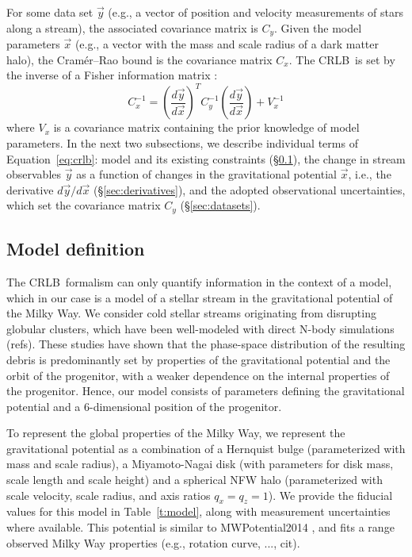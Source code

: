\documentclass[modern]{aastex61}
\newcommand{\acronym}[1]{{\small{#1}}}
\newcommand{\CRLB}{\acronym{CRLB}}
\begin{document}
For some data set $\vec{y}$ (e.g., a vector of position and velocity measurements of stars along a stream), the associated covariance matrix is $C_y$.
Given the model parameters $\vec{x}$ (e.g., a vector with the mass and scale radius of a dark matter halo), the Cram\' er--Rao bound is the covariance matrix $C_x$.
The \CRLB\ is set by the inverse of a Fisher information matrix \citep{}:
\begin{equation}
C_x^{-1} = \left(\frac{d\vec{y}}{d\vec{x}}\right)^{T} C_y^{-1} \left(\frac{d\vec{y}}{d\vec{x}}\right) + V_x^{-1}
\label{eq:crlb}
\end{equation}
where $V_x$ is a covariance matrix containing the prior knowledge of model parameters.
In the next two subsections, we describe individual terms of Equation~\ref{eq:crlb}: model and its existing constraints (\S\ref{sec:model}), the change in stream observables $\vec{y}$ as a function of changes in the gravitational potential $\vec{x}$, i.e., the derivative $d\vec{y}/d\vec{x}$ (\S\ref{sec:derivatives}), and the adopted observational uncertainties, which set the covariance matrix $C_y$ (\S\ref{sec:datasets}).

\subsection{Model definition}
\label{sec:model}
The \CRLB\ formalism can only quantify information in the context of a model, which in our case is a model of a stellar stream in the gravitational potential of the Milky Way.
We consider cold stellar streams originating from disrupting globular clusters, which have been well-modeled with direct N-body simulations (refs).
These studies have shown that the phase-space distribution of the resulting debris is predominantly set by properties of the gravitational potential and the orbit of the progenitor, with a weaker dependence on the internal properties of the progenitor.
Hence, our model consists of parameters defining the gravitational potential and a 6-dimensional position of the progenitor.

To represent the global properties of the Milky Way, we represent the gravitational potential as a combination of a Hernquist bulge (parameterized with mass and scale radius), a Miyamoto-Nagai disk (with parameters for disk mass, scale length and scale height) and a spherical NFW halo (parameterized with scale velocity, scale radius, and axis ratios $q_x=q_z=1$).
We provide the fiducial values for this model in Table~\ref{t:model}, along with measurement uncertainties where available.
This potential is similar to MWPotential2014 \citep{galpy}, and fits a range observed Milky Way properties (e.g., rotation curve, ..., cit).
\end{document}
